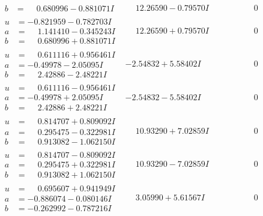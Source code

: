 \documentclass[1p]{elsarticle_modified}
\theoremstyle{definition}
\begin{document}
$$\begin{array}{c|c|c}
\begin{aligned}
b &= \phantom{-}0.680996 - 0.881071 I\end{aligned}
 & \phantom{-}12.26590 - 0.79570 I & \phantom{-0.000000 } 0 \\ \hline\begin{aligned}
u &= -0.821959 - 0.782703 I \\
a &= \phantom{-}1.141410 - 0.345243 I \\
b &= \phantom{-}0.680996 + 0.881071 I\end{aligned}
 & \phantom{-}12.26590 + 0.79570 I & \phantom{-0.000000 } 0 \\ \hline\begin{aligned}
u &= \phantom{-}0.611116 + 0.956461 I \\
a &= -0.49978 - 2.05095 I \\
b &= \phantom{-}2.42886 - 2.48221 I\end{aligned}
 & -2.54832 + 5.58402 I & \phantom{-0.000000 } 0 \\ \hline\begin{aligned}
u &= \phantom{-}0.611116 - 0.956461 I \\
a &= -0.49978 + 2.05095 I \\
b &= \phantom{-}2.42886 + 2.48221 I\end{aligned}
 & -2.54832 - 5.58402 I & \phantom{-0.000000 } 0 \\ \hline\begin{aligned}
u &= \phantom{-}0.814707 + 0.809092 I \\
a &= \phantom{-}0.295475 - 0.322981 I \\
b &= \phantom{-}0.913082 - 1.062150 I\end{aligned}
 & \phantom{-}10.93290 + 7.02859 I & \phantom{-0.000000 } 0 \\ \hline\begin{aligned}
u &= \phantom{-}0.814707 - 0.809092 I \\
a &= \phantom{-}0.295475 + 0.322981 I \\
b &= \phantom{-}0.913082 + 1.062150 I\end{aligned}
 & \phantom{-}10.93290 - 7.02859 I & \phantom{-0.000000 } 0 \\ \hline\begin{aligned}
u &= \phantom{-}0.695607 + 0.941949 I \\
a &= -0.886074 - 0.080146 I \\
b &= -0.262992 - 0.787216 I\end{aligned}
 & \phantom{-}3.05990 + 5.61567 I & \phantom{-0.000000 } 0 \\ \hline\begin{aligned}

\end{aligned}
\end{array}$$
\end{document}
